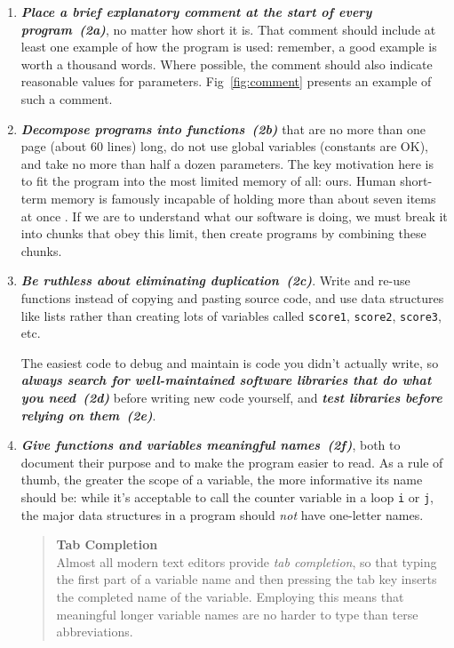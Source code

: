 \documentclass[10pt,letterpaper]{article}
\newcommand{\practice}[2]{\textbf{\emph{{#2}~({#1})}}}
\begin{document}
\begin{enumerate}

\item
  \practice{2a}{Place a brief explanatory comment at the start of every
    program}, no matter how short it is. That comment should include
  at least one example of how the program is used: remember, a good
  example is worth a thousand words. Where possible, the comment
  should also indicate reasonable values for parameters.
  Fig~\ref{fig:comment} presents an example of such a comment.

\item
  \practice{2b}{Decompose programs into functions} that are no more than
  one page (about 60 lines) long, do not
  use global variables (constants are OK), and take no more than half
  a dozen parameters.  The key motivation here is to fit the program
  into the most limited memory of all: ours. Human short-term memory
  is famously incapable of holding more than about seven items at
  once \cite{miller1956}. If we are to understand
  what our software is doing, we must break it into chunks that obey
  this limit, then create programs by combining these chunks.

\item
  \practice{2c}{Be ruthless about eliminating duplication}. Write and
  re-use functions instead of copying and pasting source code, and use
  data structures like lists rather than creating lots of variables
  called \texttt{score1}, \texttt{score2}, \texttt{score3}, etc.

  The easiest code to debug and maintain is code you didn't
  actually write, so \practice{2d}{always search for well-maintained
  software libraries that do what you need} before writing new code yourself,
  and \practice{2e}{test libraries before relying on them}.

\item
  \practice{2f}{Give functions and variables meaningful names}, both to
  document their purpose and to make the program easier to read. As a
  rule of thumb, the greater the scope of a variable, the more
  informative its name should be: while it's acceptable to call the
  counter variable in a loop \texttt{i} or \texttt{j}, the major data
  structures in a program should \emph{not} have one-letter names.

  \begin{quote}
    \noindent \textbf{Tab Completion}
    \\
    Almost all modern text editors provide \emph{tab completion}, so
    that typing the first part of a variable name and then pressing
    the tab key inserts the completed name of the variable.  Employing
    this means that meaningful longer variable names are no harder to type
    than terse abbreviations.


\end{quote}
\end{enumerate}
\end{document}
